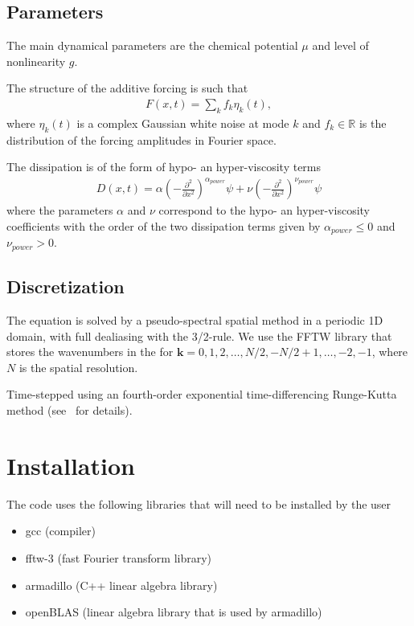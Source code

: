 \documentclass[%
 reprint,
superscriptaddress,
aps,
pra,
onecolumn, 
]{revtex4-1}
\begin{document}
\subsection{Parameters}

The main dynamical parameters are the chemical potential $\mu$ and level of nonlinearity $g$.

The structure of the additive forcing is such that
\begin{align*}
F(x,t) = \sum_{k} f_k \eta_k(t),
\end{align*}
where $\eta_k(t)$ is a complex Gaussian white noise at mode $k$ and $f_k\in \mathbb{R}$ is the distribution of the forcing amplitudes in Fourier space.

The dissipation is of the form of hypo- an hyper-viscosity terms
\begin{align*}
D(x,t) = \alpha \left(-\frac{\partial^2}{\partial x^2}\right)^{\alpha_{power}}\psi +\nu \left(-\frac{\partial^2}{\partial x^2}\right)^{\nu_{power}}\psi
\end{align*}
where the parameters $\alpha$ and $\nu$ correspond to the hypo- an hyper-viscosity coefficients with the order of the two dissipation terms given by $\alpha_{power}\leq 0$ and $\nu_{power}>0$.

\subsection{Discretization}

The equation is solved by a pseudo-spectral spatial method in a periodic 1D domain, with full dealiasing with the 3/2-rule. We use the FFTW library that stores the wavenumbers in the for $\mathbf{k} = 0,1,2,\dots, N/2, -N/2 +1, \dots, -2,-1$, where $N$ is the spatial resolution.

Time-stepped using an fourth-order exponential time-differencing Runge-Kutta method (see~\cite{Kassam_fourth-order_2005,cox_exponential_2002} for details).


\section{Installation}

The code uses the following libraries that will need to be installed by the user
\begin{itemize}
\item gcc (compiler)
\item fftw-3 (fast Fourier transform library)
\item armadillo (C++ linear algebra library)
\item openBLAS (linear algebra library that is used by armadillo)
\end{itemize}
\end{document}
